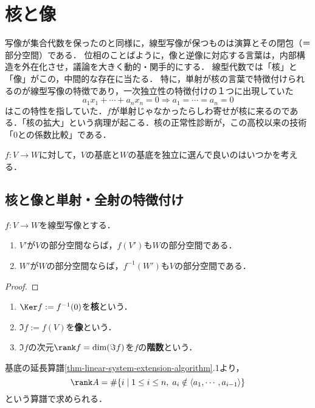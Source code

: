 \documentclass[uplatex, dvipdfmx]{jsreport}
\begin{document}
\section{核と像}

\begin{tcolorbox}[colframe=ForestGreen, colback=ForestGreen!10!white, breakable]
    写像が集合代数を保ったのと同様に，線型写像が保つものは演算とその閉包（＝部分空間）である．
    位相のことばように，像と逆像に対応する言葉は，内部構造を外在化させ，議論を大きく動的・関手的にする．
    線型代数では「核」と「像」がこの，中間的な存在に当たる．
    特に，単射が核の言葉で特徴付けられるのが線型写像の特徴であり，一次独立性の特徴付けの１つに出現していた
    \[a_1x_1+\cdots+a_nx_n=0\Rightarrow a_1=\cdots=a_n=0 \]
    はこの特性を指していた．$f$が単射じゃなかったらしわ寄せが核に来るのである．「核の拡大」という病理が起こる．核の正常性診断が，この高校以来の技術「$0$との係数比較」である．

    $f:V\to W$に対して，$V$の基底と$W$の基底を独立に選んで良いのはいつかを考える．
\end{tcolorbox}

\subsection{核と像と単射・全射の特徴付け}

\begin{proposition}
    $f:V\to W$を線型写像とする．
    \begin{enumerate}
        \item $V'$が$V$の部分空間ならば，$f(V')$も$W$の部分空間である．
        \item $W'$が$W$の部分空間ならば，$f^{-1}(W')$も$V$の部分空間である．
    \end{enumerate}
\end{proposition}
\begin{proof}
    
\end{proof}

\begin{definition}\mbox{}
    \begin{enumerate}
        \item $\Ker f:=f^{-1}(0)$を\textbf{核}という．
        \item $\Im f:=f(V)$を\textbf{像}という．
        \item $\Im f$の次元$\rank f=\dim(\Im f)$を$f$の\textbf{階数}という．
    \end{enumerate}
\end{definition}
\begin{corollary}
    基底の延長算譜\ref{thm-linear-system-extension-algorithm}.1より，
    \[ \rank A=\#\{i\mid 1\le i\le n,\;a_i\notin\langle a_1,\cdots,a_{i-1}\rangle\} \]
    という算譜で求められる．
\end{corollary}
\end{document}
